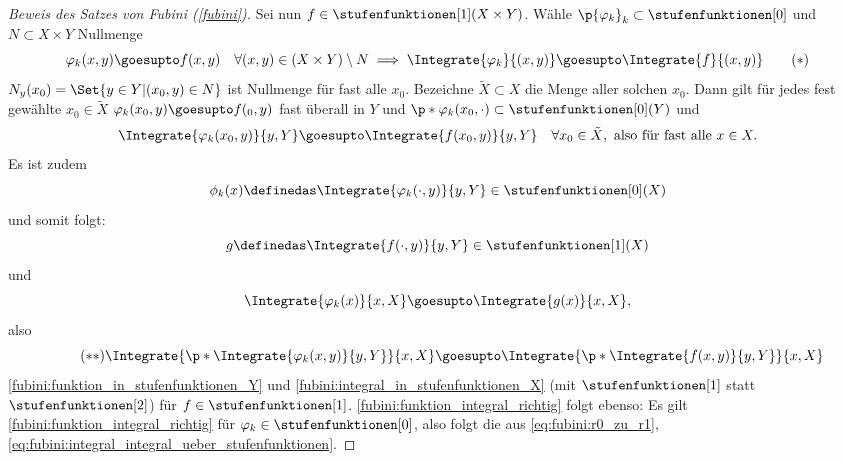 \begin{proof}[Beweis des Satzes von Fubini (\ref{fubini})]
  Sei nun \( f\in \stufenfunktionen[1](X\times Y) \). Wähle \( \p{\varphi_k}_k \subset \stufenfunktionen[0] \) und \( N\subset X\times Y \) Nullmenge \sd
  \begin{equation*}
    \varphi_k (x,y) \goesupto f(x,y) \quad \forall (x,y)\in (X\times Y)\setminus N\implies \Integrate{\varphi_k}{{(x,y)}}\goesupto \Integrate{f}{{(x,y)}}\tag{\( * \)}\label{eq:fubini:r0_zu_r1}
  \end{equation*}
   \timplies \( N_y(x_0)=\Set{y\in Y|(x_0,y)\in N} \) ist Nullmenge für fast alle \( x_0 \). Bezeichne \( \tilde{X}\subset X \) die Menge aller solchen \( x_0 \). Dann gilt für jedes fest gewählte \( x_0\in \tilde{X} \) \( \varphi_k(x_0,y)\goesupto f(_0,y) \) fast überall in \( Y \) und \( \p*{\varphi_k(x_0,\cdot)}\subset \stufenfunktionen[0](Y) \) und
  \begin{equation*}
    \Integrate{\varphi_k(x_0,y)}{y,Y}\goesupto \Integrate{f(x_0,y)}{y,Y}\quad \forall x_0\in \tilde{X}, \text{ also für fast alle } x\in X.
  \end{equation*}
  Es ist zudem
  \begin{equation*}
  \phi_k(x)\definedas \Integrate{\varphi_k(\cdot,y)}{y,Y}\in \stufenfunktionen[0](X)
  \end{equation*}
  und somit folgt:
  \begin{equation*}
    g\definedas\Integrate{f(\cdot,y)}{y,Y}\in \stufenfunktionen[1](X)
  \end{equation*}
  und
  \begin{equation}
    \Integrate{\varphi_k(x)}{x,X}\goesupto \Integrate{g(x)}{x,X},
  \end{equation}
  also
  \begin{equation*}
    \tag{\( ** \)}\label{eq:fubini:integral_integral_ueber_stufenfunktionen} \Integrate{\p*{\Integrate{\varphi_k(x,y)}{y,Y}}}{x,X}\goesupto \Integrate{\p*{\Integrate{f(x,y)}{y,Y}}}{x,X}
  \end{equation*}
  \timplies \ref{fubini:funktion_in_stufenfunktionen_Y} und \ref{fubini:integral_in_stufenfunktionen_X} (mit \( \stufenfunktionen[1] \) statt \( \stufenfunktionen[2] \)) für \( f\in \stufenfunktionen[1] \). \ref{fubini:funktion_integral_richtig} folgt ebenso: Es gilt \ref{fubini:funktion_integral_richtig} für \( \varphi_k\in \stufenfunktionen[0] \), also folgt die \Beh aus \eqref{eq:fubini:r0_zu_r1}, \eqref{eq:fubini:integral_integral_ueber_stufenfunktionen}. 


\end{proof}

